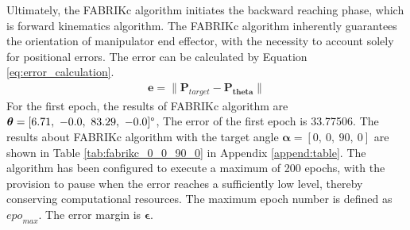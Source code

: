 Ultimately, the FABRIKc algorithm initiates the backward reaching phase, which is forward kinematics algorithm. The 
FABRIKc algorithm inherently guarantees the orientation of manipulator end effector,  with the necessity to account 
solely for positional errors. The error can be calculated by Equation \ref{eq:error_calculation}.
\begin{align}
    \textbf{e} = \lVert\textbf{P}_{target} - \textbf{P}_{\boldsymbol{theta}}\rVert
    \label{eq:error_calculation}
\end{align}
For the first epoch, the results of FABRIKc algorithm are 
$\boldsymbol{\theta} = [6.71,\ -0.0,\ 83.29,\ -0.0]\degree $, 
The error of the first epoch is 33.77506. The results about FABRIKc algorithm with the target angle 
$\boldsymbol{\alpha} = [0,\ 0,\ 90,\ 0] $ are shown in Table \ref{tab:fabrikc_0_0_90_0} 
in Appendix \ref{append:table}. The algorithm has been configured to execute a maximum of 200 epochs, with 
the provision to pause when the error reaches a sufficiently low level, thereby conserving computational resources. 
The maximum epoch number is defined as ${epo}_{max}$. The error margin is $\boldsymbol{\epsilon}$.
